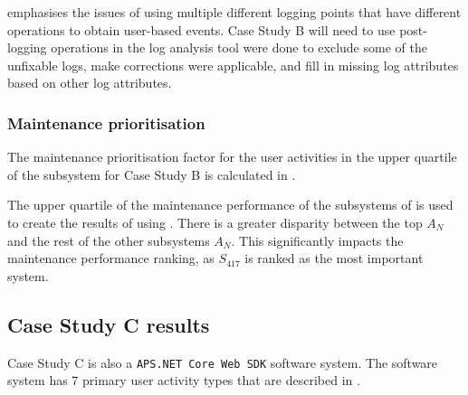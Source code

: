  emphasises the issues of using multiple different logging points that have different operations to obtain user-based events. Case Study B will need to use post-logging operations in the log analysis tool were done to exclude some of the unfixable logs, make corrections were applicable, and fill in missing log attributes based on other log attributes.

\subsubsection{Maintenance prioritisation}
The maintenance prioritisation factor for the user activities in the upper quartile of the subsystem for Case Study B is calculated in .



The upper quartile of the maintenance performance of the subsystems of  is used to create the results of  using . There is a greater disparity between the top $A_N$ and the rest of the other subsystems $A_N$. This significantly impacts the maintenance performance ranking, as $S_{417}$ is ranked as the most important system.

\subsection{Case Study C results}\label{sec:ch3_csC}
Case Study C is also a \texttt{APS.NET Core Web SDK} software system. The software system has 7 primary user activity types that are described in .

